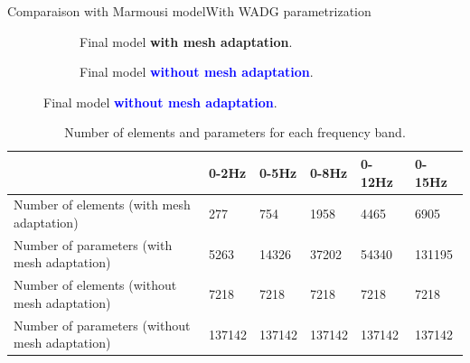 
\begin{frame}{Comparaison with Marmousi model}{With WADG parametrization}
  \vspace{-0.8cm}
  \setlength{\modelwidth}{6.0cm}
  \begin{figure}[!htbp]
    \renewcommand{\modelfile}{image/mesh_adapt/wadg_adapt_vp_80}
     \begin{subfigure}[!htbp]{0.5\textwidth}
        \vspace{0.5cm}
        \hspace{-0.5cm}
         \centering
         
         \caption*{Final model \textcolor{\mygreen}{\textbf{with mesh adaptation}}.}
         \label{marmousi_mesh_padapt}
     \end{subfigure}
     \hspace{-1cm}
     \renewcommand{\modelfile}{image/mesh_adapt/wadg_classic_vp_80}
     \renewcommand{\cmapmin}{1500}
     \renewcommand{\cmapmax}{5000}
     \begin{subfigure}[!htbp]{0.5\textwidth}
         \centering
         
         \vspace{-0.6cm}
                  \caption*{Final model \textcolor{blue}{\textbf{without mesh adaptation}}.}
     \end{subfigure}
  \end{figure}

  \scriptsize
  \begin{table}[!htbp]
\centering
\begin{tabular}{|m{3.5cm}|l|l|l|l|l|}
\hline
& 0-2Hz & 0-5Hz & 0-8Hz & 0-12Hz & 0-15Hz  \\ \hline
\rowcolor{green!30}
Number of elements \newline (with mesh adaptation)      & 277    & 754     & 1958    & 4465     & 6905  \\ \hline
\rowcolor{green!30}
Number of parameters \newline (with mesh adaptation)      & 5263    & 14326     &  37202   & 54340     & 131195  \\ \hline
\rowcolor{blue!30}
Number of elements \newline (without mesh adaptation)      & 7218    & 7218     & 7218    & 7218     & 7218  \\ \hline
\rowcolor{blue!30}
Number of parameters \newline (without mesh adaptation)      & 137142    & 137142     & 137142    & 137142     & 137142  \\ \hline
\end{tabular}
\caption{Number of elements and parameters for each frequency band.}
\label{nb_elem_mesh_adapt_wadg}
\end{table}
\end{frame}


